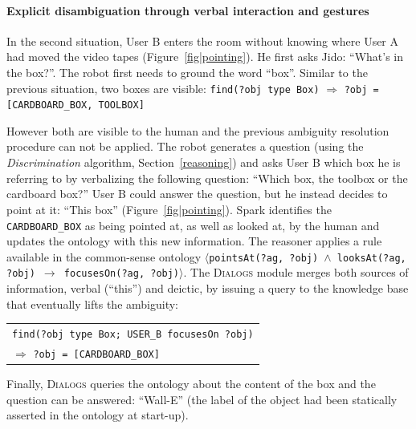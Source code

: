\documentclass[preprint,3p,times]{elsarticle}
\newcommand{\concept}[1]{{\small \texttt{#1}}}
\newcommand{\stmt}[1]{{\footnotesize\tt$\langle$#1\relax$\rangle$}}
\begin{document}
\paragraph{Explicit disambiguation through verbal interaction and gestures}
\label{sec:cleaning-table}

In the second situation, User B enters the room without knowing where
User A had moved the video tapes (Figure~\ref{fig|pointing}). He first asks
Jido: ``What's in the box?''. The robot first needs to ground the word ``box''.
Similar to the previous situation, two boxes are visible: \concept{find(?obj
type Box)} $\Rightarrow$ \concept{?obj = [CARDBOARD\_BOX, TOOLBOX]}

However both are visible to the human and the previous ambiguity resolution
procedure can not be applied. The robot generates a question (using the
\emph{Discrimination} algorithm, Section~\ref{reasoning})
and asks User B which box he is referring to by verbalizing the following question: ``Which box, the toolbox or the
cardboard box?'' User B could answer the question, but he instead decides to point
at it: ``This box'' (Figure~\ref{fig|pointing}). {\sc Spark} identifies the {\tt
CARDBOARD\_BOX} as being pointed at, as well as looked at, by the human and updates the
ontology with this new information. The reasoner applies a rule available in the common-sense
ontology \stmt{pointsAt(?ag, ?obj) $\land$ looksAt(?ag, ?obj) $\to$
focusesOn(?ag, ?obj)}. The \textsc{Dialogs} module merges both
sources of information, verbal (``this'') and deictic, by issuing a 
query to the knowledge base that eventually lifts the ambiguity:

\begin{center} 
    \begin{tabular}{l} 
        \concept{find(?obj type Box; USER\_B focusesOn ?obj)}\\ 
        \hspace{0.7cm}$\Rightarrow$ {\tt ?obj = [CARDBOARD\_BOX]}
    \end{tabular} 
\end{center}

Finally, \textsc{Dialogs} queries the ontology about the content of the box and
the question can be answered: ``Wall-E'' (the label of the object had been statically
asserted in the ontology at start-up).

\end{document}
